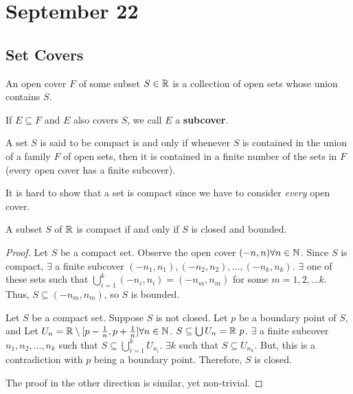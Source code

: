 \section{September 22}

\subsection{Set Covers}
\begin{definition}
    An open cover $F$ of some subset $S \in \mathbb{R}$ is a collection of open sets whose union contains $S$.
\end{definition}
\begin{remark}
    If $E \subseteq F$ and $E$ also covers $S$, we call $E$ a \textbf{subcover}.
\end{remark}

\begin{definition}[Compact]
    A set $S$ is said to be compact is and only if whenever $S$ is contained in the union of a family $F$ of open sets, then it is contained in a finite number of the sets in $F$ (every open cover has a finite subcover).
\end{definition}
\begin{remark}
    It is hard to show that a set is compact since we have to consider \emph{every} open cover.
\end{remark}

\begin{theorem}
    A subset $S$ of $\mathbb{R}$ is compact if and only if $S$ is closed and bounded.
\end{theorem}
\begin{proof}
    Let $S$ be a compact set. Observe the open cover $(-n, n) \forall n \in \mathbb{N}$. Since $S$ is compact, $\exists$ a finite subcover $(-n_1, n_1), (-n_2, n_2), \ldots, (-n_k, n_k)$. $\exists$ one of these sets such that $\bigcup_{i=1}^k (-n_i, n_i) = (-n_m, n_m)$ for some $m = 1, 2, \ldots k$. Thus, $S \subseteq (-n_m, n_m)$, so $S$ is bounded.

    Let $S$ be a compact set. Suppose $S$ is not closed. Let $p$ be a boundary point of $S$, and Let $U_n = \mathbb{R} \setminus [p - \frac{1}{n}, p + \frac{1}{n}] \forall n \in \mathbb{N}$. $S \subseteq \bigcup U_n = \mathbb{R} \ {p}$. $\exists$ a finite subcover $n_1, n_2, \ldots, n_k$ such that $S \subseteq \bigcup_{i=1}^k U_{n_i}$. $\exists k$ such that $S \subseteq U_{n_k}$. But, this is a contradiction with $p$ being a boundary point. Therefore, $S$ is closed.

    The proof in the other direction is similar, yet non-trivial.
\end{proof}


